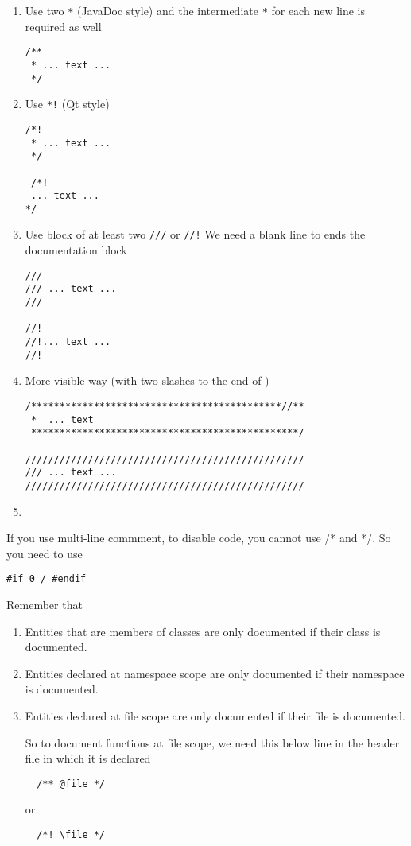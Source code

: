 \begin{enumerate}
  \item Use two \verb!*! (JavaDoc style) and the intermediate \verb!*! for
  each new line is required as well
\begin{verbatim}
/**
 * ... text ...
 */
\end{verbatim}

  \item Use \verb/*!/ (Qt style)
\begin{verbatim}
/*!
 * ... text ...
 */
 
 /*!
 ... text ...
*/
\end{verbatim}

  \item Use block of at least two \verb!///! or  \verb.//!. We need a blank line
  to ends the documentation block
\begin{verbatim}
///
/// ... text ...
///

//!
//!... text ...
//!
\end{verbatim}
  \item More visible way (with two slashes to the end of )
\begin{verbatim}
/********************************************//**
 *  ... text
 ***********************************************/
 
/////////////////////////////////////////////////
/// ... text ...
///////////////////////////////////////////////// 
\end{verbatim}
  \item 
\end{enumerate}

If you use multi-line commment, to disable code, you cannot use /* and */. So
you need to use
\begin{verbatim}
#if 0 / #endif
\end{verbatim} 


Remember that
\begin{enumerate}
  \item Entities that are members of classes are only documented if their class
  is documented. 
  
  \item Entities declared at namespace scope are only documented if their
  namespace is documented. 
  
  \item Entities declared at file scope are only documented if their file is
  documented. 
  
  So to document functions at file scope, we need this below line in the header
  file in which it is declared
  \begin{verbatim}
  /** @file */
  \end{verbatim}
  or
  \begin{verbatim}
  /*! \file */
  \end{verbatim}
\end{enumerate}



